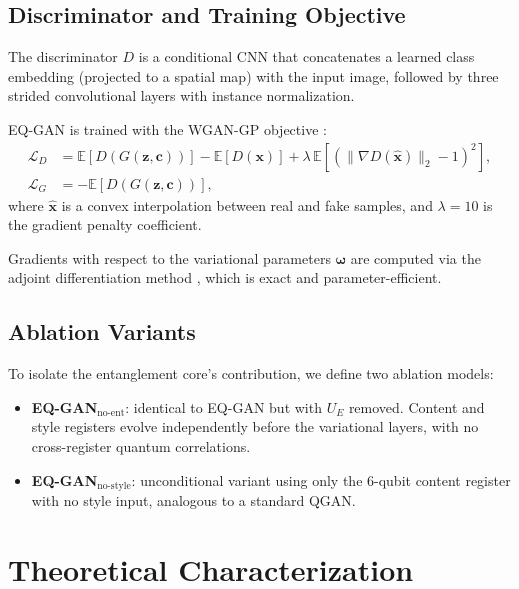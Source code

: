 \documentclass[twocolumn]{article}
\begin{document}
\subsection{Discriminator and Training Objective}
The discriminator $D$ is a conditional CNN that concatenates a learned class
embedding (projected to a spatial map) with the input image, followed by three
strided convolutional layers with instance normalization.

EQ-GAN is trained with the WGAN-GP objective \cite{gulrajani2017improved}:
\begin{align}
  \mathcal{L}_D &= \mathbb{E}[D(G(\mathbf{z},\mathbf{c}))] - \mathbb{E}[D(\mathbf{x})]
    + \lambda \, \mathbb{E}\!\left[(\|\nabla D(\hat{\mathbf{x}})\|_2 - 1)^2\right], \\
  \mathcal{L}_G &= -\mathbb{E}[D(G(\mathbf{z},\mathbf{c}))],
\end{align}
where $\hat{\mathbf{x}}$ is a convex interpolation between real and fake samples,
and $\lambda = 10$ is the gradient penalty coefficient.

Gradients with respect to the variational parameters $\boldsymbol{\omega}$ are
computed via the adjoint differentiation method \cite{jones2020differentiating},
which is exact and parameter-efficient.

\subsection{Ablation Variants}

To isolate the entanglement core's contribution, we define two ablation models:

\begin{itemize}
  \item \textbf{EQ-GAN$_\text{no-ent}$}: identical to EQ-GAN but with $U_E$
    removed. Content and style registers evolve independently before the
    variational layers, with no cross-register quantum correlations.
  \item \textbf{EQ-GAN$_\text{no-style}$}: unconditional variant using only the
    6-qubit content register with no style input, analogous to a standard QGAN.
\end{itemize}

\section{Theoretical Characterization}
\label{sec:theory}
\end{document}
